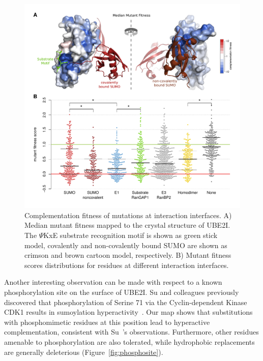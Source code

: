 \begin{figure}[h!]
	\centering
	\includegraphics[width=\textwidth]{img/ube2i_interfaces.pdf}
	\caption{Complementation fitness of mutations at interaction interfaces. A) Median mutant fitness mapped to the crystal structure of UBE2I. The $\Psi$KxE substrate recognition motif is shown as green stick model, covalently and non-covalently bound SUMO are shown as crimson and brown cartoon model, respectively. B) Mutant fitness scores distributions for residues at different interaction interfaces. }
	\label{fig:ube2i_interfaces}
\end{figure}

Another interesting observation can be made with respect to a known phosphorylation site on the surface of UBE2I. Su and colleagues previously discovered that phosphorylation of Serine 71 via the Cyclin-dependent Kinase CDK1 results in sumoylation hyperactivity~\cite{su_phosphorylation_2012}. Our map shows that substitutions with phosphomimetic residues at this position lead to hyperactive complementation, consistent with Su~\etal's observations. Furthermore, other residues amenable to phosphorylation are also tolerated, while hydrophobic replacements are generally deleterious (Figure~\ref{fig:phosphosite}).


